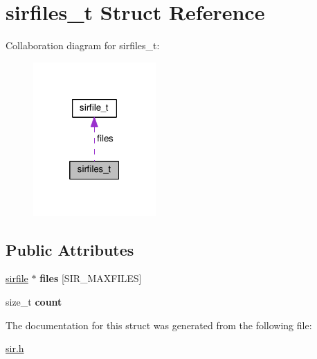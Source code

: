 \hypertarget{structsirfiles__t}{}\section{sirfiles\+\_\+t Struct Reference}
\label{structsirfiles__t}


Collaboration diagram for sirfiles\+\_\+t\+:\nopagebreak
\begin{figure}[H]
\begin{center}
\leavevmode
\includegraphics[width=133pt]{structsirfiles__t__coll__graph}
\end{center}
\end{figure}
\subsection*{Public Attributes}
\begin{DoxyCompactItemize}
\item 
\hyperlink{structsirfile__t}{sirfile} $\ast$ {\bfseries files} \mbox{[}S\+I\+R\+\_\+\+M\+A\+X\+F\+I\+L\+ES\mbox{]}\hypertarget{structsirfiles__t_a4649cb5e18d7e800ba10538652db61eb}{}\label{structsirfiles__t_a4649cb5e18d7e800ba10538652db61eb}

\item 
size\+\_\+t {\bfseries count}\hypertarget{structsirfiles__t_acf93edd3275779888b3598fba4d1adb2}{}\label{structsirfiles__t_acf93edd3275779888b3598fba4d1adb2}

\end{DoxyCompactItemize}


The documentation for this struct was generated from the following file\+:\begin{DoxyCompactItemize}
\item 
\hyperlink{sir_8h}{sir.\+h}\end{DoxyCompactItemize}
